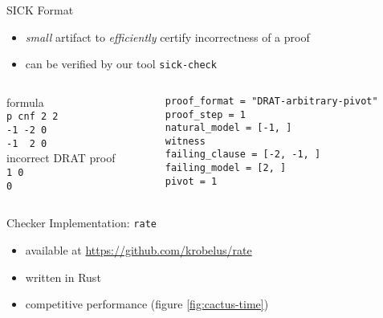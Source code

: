 \documentclass[final,hyperref={pdfpagelabels=true}]{beamer}
\begin{document}
\begin{frame}[fragile]
\begin{columns}[t]
    \begin{column}{.45\textwidth}
    \begin{block}{SICK Format}
        \begin{itemize}
            \item \emph{small} artifact to \emph{efficiently} certify
            incorrectness of a proof
            \item can be verified by our tool \texttt{sick-check}
        \end{itemize}
        \vspace{1cm}
        \begin{columns}[t]
            \begin{column}{.25\textwidth}
                formula\\
                \texttt{p cnf 2 2\\-1 -2 0\\ -1\ \ 2 0\\}
                incorrect DRAT proof\\
                \texttt{1 0\\0\\}
            \end{column}
            \begin{column}{.8\textwidth}
                \texttt{proof\_format = "DRAT-arbitrary-pivot"\\
proof\_step     = 1\\
natural\_model  = [-1, ]\\
\lbrack\lbrack{}witness\rbrack\rbrack{}\\
failing\_clause = [-2, -1, ]\\
failing\_model  = [2, ]\\
pivot          = 1\\
                }
            \end{column}
        \end{columns}
    \end{block}
    \begin{block}{Checker Implementation: \texttt{rate}}
        \begin{itemize}
            \item available at \url{https://github.com/krobelus/rate}
            \item written in Rust
            \item competitive performance (figure \ref{fig:cactus-time})
        \end{itemize}
    \end{block}


\end{column}
\end{columns}
\end{frame}
\end{document}
